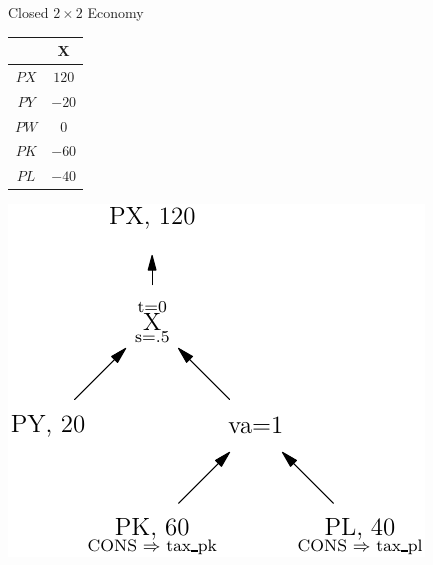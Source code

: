 \documentclass{beamer}
\begin{document}
\begin{frame}{Closed $2\times 2$ Economy}

    \begin{minipage}{.2\textwidth}
        \begin{tabular}{cc}
            & X             \\ \hline
            $PX$  & $120$   \\
            $PY$  & $-20$   \\
            $PW$  & $0  $   \\
            $PK$  & $-60$   \\
            $PL$  & $-40$   
        \end{tabular}
    \end{minipage}
    \hfill \pause
    \begin{minipage}{.78\textwidth}
        \includegraphics[width=\textwidth]{images/x_sector.pdf}
    \end{minipage}
\end{frame}
\end{document}
